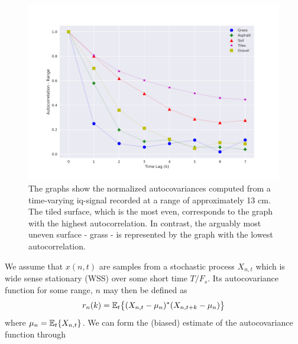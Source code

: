 \begin{figure}[h]
	\centering
	\includegraphics[scale=0.45]{figs_temp/features/autocorr_range.png}
	\caption{The graphs show the normalized autocovariances computed from a time-varying \gls{iq}-signal recorded at a range of approximately 13 cm. The tiled surface, which is the most even, corresponds to the graph with the highest autocorrelation. In contrast, the arguably most uneven surface - grass - is represented by the graph with the lowest autocorrelation.}
	\label{fig:autocorr_range}
\end{figure}




We assume that $x(n,t)$ are samples from a stochastic process $X_{n,t}$ which is wide sense stationary (WSS) \citep{jakobsson_2015} over some short time $T/F_s$. Its autocovariance function for some range, $n$ may then be defined as
\begin{equation}
	r_n(k) = {\operatorname*{\mathbb{E}}}_t\big\{(X_{n,t} - \mu_n)^*(X_{n,t+k} - \mu_n)\big\}
\end{equation}
where $\mu_n=\operatorname*{\mathbb{E}}_t\{X_{n,t}\}$. We can form the (biased) estimate of the autocovariance function through


